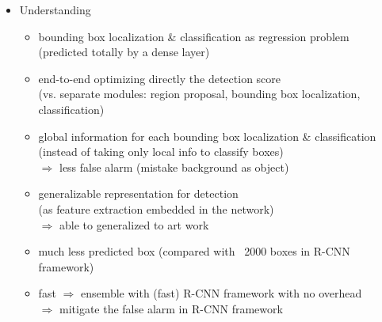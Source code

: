 \begin{itemize}
\begin{itemize}
	\item Understanding
		\begin{itemize}
		\item bounding box localization \& classification as regression problem \\
		(predicted totally by a dense layer)
		\item end-to-end optimizing directly the detection score \\
		(vs. separate modules: region proposal, bounding box localization, classification)
		\item global information for each bounding box localization \& classification \\
		(instead of taking only local info to classify boxes) \\
		$\Rightarrow$ less false alarm (mistake background as object)
		\item generalizable representation for detection \\
		(as feature extraction embedded in the network) \\
		$\Rightarrow$ able to generalized to art work
		\item much less predicted box (compared with ~2000 boxes in R-CNN framework)
		\item fast $\Rightarrow$ ensemble with (fast) R-CNN framework with no overhead \\
		$\Rightarrow$ mitigate the false alarm in R-CNN framework
		\end{itemize}
	\end{itemize}


\end{itemize}
